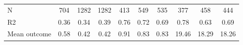 \begin{tabular}{lccc|ccc|ccc}
N           &         704         &        1282         &        1282         &         413         &         549         &         535         &         377         &         458         &         444         \\
R2          &        0.36         &        0.34         &        0.39         &        0.76         &        0.72         &        0.69         &        0.78         &        0.63         &        0.69         \\
Mean outcome&        0.58         &        0.42         &        0.42         &        0.91         &        0.83         &        0.83         &       19.46         &       18.29         &       18.26         \\
\bottomrule \end{tabular}
